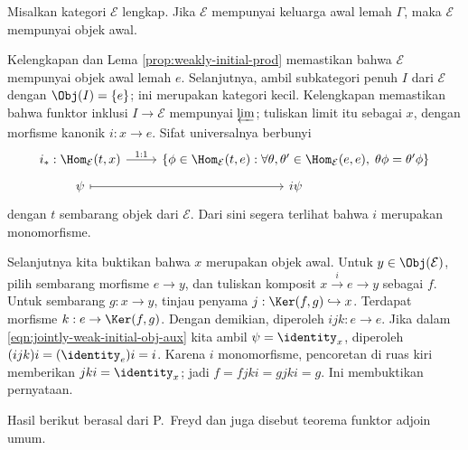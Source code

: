 \begin{lema}\label{prop:jointly-weak-initial-obj}
	Misalkan kategori $\mathcal{E}$ lengkap. Jika $\mathcal{E}$ mempunyai
	keluarga awal lemah $\Gamma$, maka $\mathcal{E}$ mempunyai objek awal.
\end{lema}
\begin{bukti}
	Kelengkapan dan Lema \ref{prop:weakly-initial-prod} memastikan bahwa
	$\mathcal{E}$ mempunyai objek awal lemah $e$. Selanjutnya, ambil
	subkategori penuh $I$ dari $\mathcal{E}$ dengan $\Obj(I)=\{e\}$; ini
	merupakan kategori kecil. Kelengkapan memastikan bahwa funktor inklusi
	$I\to\mathcal{E}$ mempunyai $\varprojlim$; tuliskan limit itu sebagai
	$x$, dengan morfisme kanonik $i:x\to e$. Sifat universalnya berbunyi
	\begin{equation}\label{eqn:jointly-weak-initial-obj-aux}
	\begin{tikzcd}[row sep=tiny]
		i_*: \Hom_{\mathcal{E}}(t, x) \arrow[r, "1:1"] & \left\{ \phi \in \Hom_{\mathcal{E}}(t, e) : \forall \theta, \theta' \in \Hom_{\mathcal{E}}(e, e), \; \theta \phi = \theta' \phi \right\} \\
		\psi \arrow[r, mapsto] & i\psi
	\end{tikzcd}\end{equation}
	dengan $t$ sembarang objek dari $\mathcal{E}$. Dari sini segera terlihat
	bahwa $i$ merupakan monomorfisme.

	Selanjutnya kita buktikan bahwa $x$ merupakan objek awal. Untuk
	$y\in\Obj(\mathcal{E})$, pilih sembarang morfisme $e\to y$, dan tuliskan
	komposit $x\xrightarrow{i}e\to y$ sebagai $f$. Untuk sembarang
	$g:x\to y$, tinjau penyama $j:\Ker(f,g)\hookrightarrow x$. Terdapat
	morfisme $k:e\to\Ker(f,g)$. Dengan demikian, diperoleh
	$ijk:e\to e$. Jika dalam
	\eqref{eqn:jointly-weak-initial-obj-aux} kita ambil
	$\psi=\identity_x$, diperoleh
	$(ijk)i=(\identity_e)i=i$. Karena $i$ monomorfisme, pencoretan di ruas
	kiri memberikan $jki=\identity_x$; jadi
	$f=fjki=gjki=g$. Ini membuktikan pernyataan.
\end{bukti}

Hasil berikut berasal dari P.\ Freyd dan juga disebut teorema funktor adjoin
umum.

